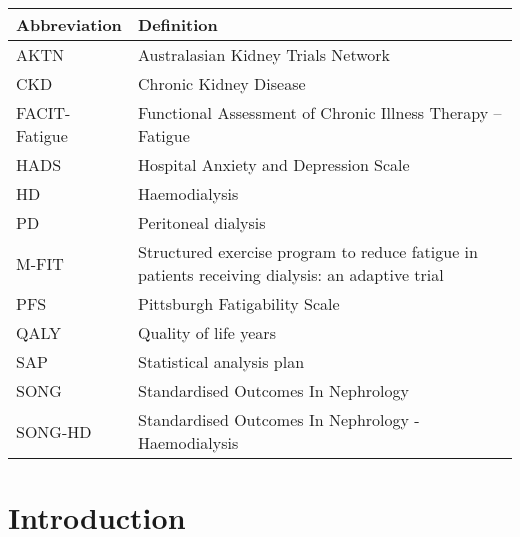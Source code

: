 \documentclass[
]{article}
\begin{document}
\begin{table}[H]
  \renewcommand{\arraystretch}{1.5}
  \centering
  \begin{tabular}{p{}p{}}
    \toprule
    Abbreviation  & Definition                                                                                      \\
    \midrule
    AKTN          & Australasian Kidney Trials Network                                                              \\
    CKD           & Chronic Kidney Disease                                                                          \\
    FACIT-Fatigue & Functional Assessment of Chronic Illness Therapy – Fatigue                                      \\
    HADS          & Hospital Anxiety and Depression Scale                                                           \\
    HD            & Haemodialysis                                                                                   \\
    PD            & Peritoneal dialysis                                                                             \\
    M-FIT         & Structured exercise program to reduce fatigue in patients receiving dialysis: an adaptive trial \\
    PFS           & Pittsburgh Fatigability Scale                                                                   \\
    QALY          & Quality of life years                                                                           \\
    SAP           & Statistical analysis plan                                                                       \\
    SONG          & Standardised Outcomes In Nephrology                                                             \\
    SONG-HD       & Standardised Outcomes In Nephrology - Haemodialysis                                             \\
    \bottomrule
  \end{tabular}
\end{table}

\clearpage

\hypertarget{introduction}{%
  \section{Introduction}\label{Introduction}}
\end{document}
